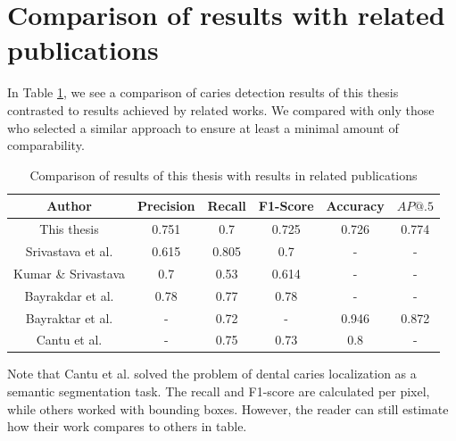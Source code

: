 \section{Comparison of results with related publications}
\label{sec:result_comparision_with_lit}
In Table \ref{tab:results_comparison}, we see a comparison of caries detection results of this thesis contrasted to results achieved by related works. We compared with only those who selected a similar approach to ensure at least a minimal amount of comparability.

\begin{table}
    \centering
    \begin{tabular}{|c|c|c|c|c|c|}
        \hline
        Author                                                                 & Precision & Recall & F1-Score & Accuracy & $AP@.5$ \\ \hline
        This thesis                                                            & 0.751     & 0.7    & 0.725    & 0.726    & 0.774   \\ \hline
        Srivastava et al. \cite{Srivastava2017}                                & 0.615     & 0.805  & 0.7      & -        & -       \\ \hline
        Kumar                                   \& Srivastava \cite{Kumar2018} & 0.7       & 0.53   & 0.614    & -        & -       \\ \hline
        Bayrakdar et al. \cite{Bayrakdar2021}                                  & 0.78      & 0.77   & 0.78     & -        & -       \\ \hline
        Bayraktar et al. \cite{Bayraktar2021}                                  & -         & 0.72   & -        & 0.946    & 0.872   \\ \hline
        Cantu et al. \cite{Cantu2020}                                          & -         & 0.75   & 0.73     & 0.8      & -       \\ \hline
    \end{tabular}
    \caption{Comparison of results of this thesis with results in related publications}
    \label{tab:results_comparison}
\end{table}

Note that Cantu et al. \cite{Cantu2020} solved the problem of dental caries localization as a semantic segmentation task. The recall and F1-score are calculated per pixel, while others worked with bounding boxes. However, the reader can still estimate how their work compares to others in table.



